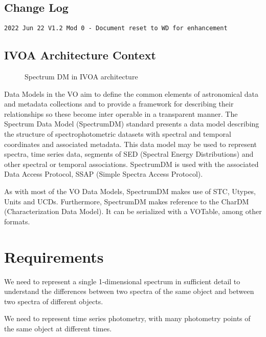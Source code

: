 \documentclass[11pt]{article}
\begin{document}
\subsection{Change Log}

\begin{verbatim}
2022 Jun 22 V1.2 Mod 0 - Document reset to WD for enhancement
\end{verbatim}


\subsection{IVOA Architecture Context}

\begin{figure}[h]

\colorbox{iblue}{
}
\caption{Spectrum DM in IVOA architecture}
\end{figure}

Data Models in the VO aim to define the common elements of astronomical data
and metadata collections and to provide a framework for describing their
relationships so these become inter operable in a transparent manner.
The Spectrum Data Model (SpectrumDM) standard presents a data model
describing the structure of spectrophotometric datasets with spectral and
temporal coordinates and associated metadata. This data model may be used to
represent spectra, time series data, segments of SED (Spectral Energy
Distributions) and other spectral or temporal associations. SpectrumDM is used
with the associated Data Access Protocol, SSAP (Simple Spectra Access 
Protocol).

As with most of the VO Data Models, SpectrumDM makes use of STC, Utypes,
Units and UCDs. Furthermore, SpectrumDM makes reference to the CharDM
(Characterization Data Model). It can be serialized with a VOTable, among
other formats.

\clearpage

\section{Requirements}

We need to represent a single 1-dimensional spectrum in sufficient
detail to understand the differences between two spectra of the same
object and between two spectra of different objects.

We need to represent time series photometry, with many photometry points
of the same object at different times.
\end{document}

